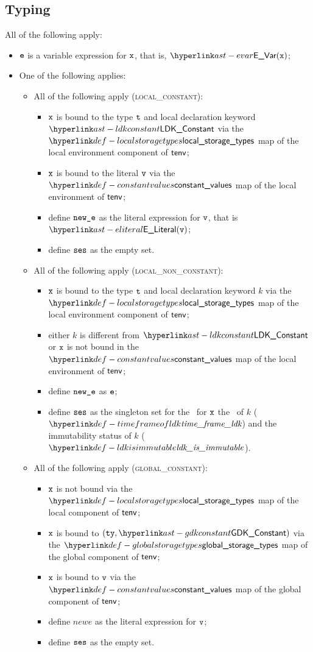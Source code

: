\subsection{Typing}
\ProseParagraph
All of the following apply:
\begin{itemize}
  \item $\texttt{e}$ is a variable expression for $\texttt{x}$, that is, $\EVar(\vx)$;
  \item One of the following applies:
  \begin{itemize}
    \item All of the following apply (\textsc{local\_constant}):
    \begin{itemize}
    \item $\texttt{x}$ is bound to the type $\texttt{t}$ and local declaration keyword $\LDKConstant$
          via the $\localstoragetypes$ map of the local environment component of $\textsf{tenv}$;
    \item $\texttt{x}$ is bound to the literal $\texttt{v}$ via the $\constantvalues$ map of the local environment of $\textsf{tenv}$;
    \item define $\texttt{new\_e}$ as the literal expression for $\texttt{v}$, that is $\eliteral{\vv}$;
    \item define $\texttt{ses}$ as the empty set.
    \end{itemize}

    \item All of the following apply (\textsc{local\_non\_constant}):
    \begin{itemize}
    \item $\texttt{x}$ is bound to the type $\texttt{t}$ and local declaration keyword $k$
          via the \\
          $\localstoragetypes$ map of the local environment component of $\textsf{tenv}$;
    \item either $k$ is different from $\LDKConstant$ or
          $\texttt{x}$ is not bound in the \\
          $\constantvalues$ map of the local environment of $\textsf{tenv}$;
    \item define $\texttt{new\_e}$ as $\texttt{e}$;
    \item define $\texttt{ses}$ as the singleton set for the \ReadLocalTerm\ for $\texttt{x}$ the \timeframeterm\ of
          $k$ ($\timeframeofldk$) and the immutability status of $k$ ($\ldkisimmutable$).
    \end{itemize}

    \item All of the following apply (\textsc{global\_constant}):
    \begin{itemize}
    \item $\texttt{x}$ is not bound via the $\localstoragetypes$ map of the local component of $\textsf{tenv}$;
    \item $\texttt{x}$ is bound to $(\tty, \GDKConstant)$ via the $\globalstoragetypes$ map of the global component of $\textsf{tenv}$;
    \item $\texttt{x}$ is bound to $\texttt{v}$ via the $\constantvalues$ map of the global component of $\textsf{tenv}$;
    \item define $newe$ as the literal expression for $\texttt{v}$;
    \item define $\texttt{ses}$ as the empty set.
    \end{itemize}


\end{itemize}
\end{itemize}
